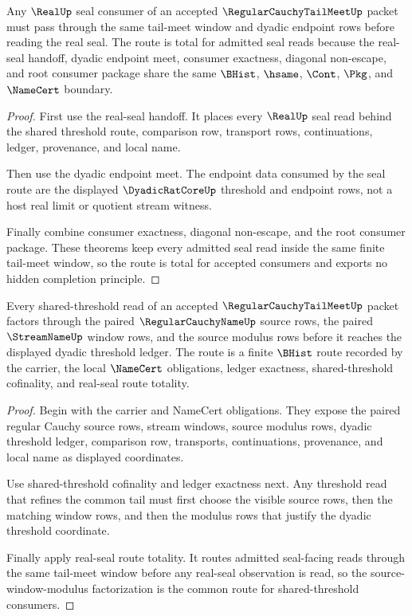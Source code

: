 \begin{theorem}
\label{thm:regular-cauchy-tail-meet-real-seal-route-totality}
Any $\RealUp$ seal consumer of an accepted $\RegularCauchyTailMeetUp$ packet must pass through the same tail-meet window and dyadic endpoint rows before reading the real seal. The route is total for admitted seal reads because the real-seal handoff, dyadic endpoint meet, consumer exactness, diagonal non-escape, and root consumer package share the same $\BHist$, $\hsame$, $\Cont$, $\Pkg$, and $\NameCert$ boundary.
\end{theorem}
\begin{proof}
First use the real-seal handoff. It places every $\RealUp$ seal read behind the shared threshold route, comparison row, transport rows, continuations, ledger, provenance, and local name.

Then use the dyadic endpoint meet. The endpoint data consumed by the seal route are the displayed $\DyadicRatCoreUp$ threshold and endpoint rows, not a host real limit or quotient stream witness.

Finally combine consumer exactness, diagonal non-escape, and the root consumer package. These theorems keep every admitted seal read inside the same finite tail-meet window, so the route is total for accepted consumers and exports no hidden completion principle.
\end{proof}

\begin{theorem}
\label{thm:regular-cauchy-tail-meet-source-window-modulus-route}
Every shared-threshold read of an accepted $\RegularCauchyTailMeetUp$ packet factors through the paired $\RegularCauchyNameUp$ source rows, the paired $\StreamNameUp$ window rows, and the source modulus rows before it reaches the displayed dyadic threshold ledger. The route is a finite $\BHist$ route recorded by the carrier, the local $\NameCert$ obligations, ledger exactness, shared-threshold cofinality, and real-seal route totality.
\end{theorem}
\begin{proof}
Begin with the carrier and NameCert obligations. They expose the paired regular Cauchy source rows, stream windows, source modulus rows, dyadic threshold ledger, comparison row, transports, continuations, provenance, and local name as displayed coordinates.

Use shared-threshold cofinality and ledger exactness next. Any threshold read that refines the common tail must first choose the visible source rows, then the matching window rows, and then the modulus rows that justify the dyadic threshold coordinate.

Finally apply real-seal route totality. It routes admitted seal-facing reads through the same tail-meet window before any real-seal observation is read, so the source-window-modulus factorization is the common route for shared-threshold consumers.
\end{proof}

